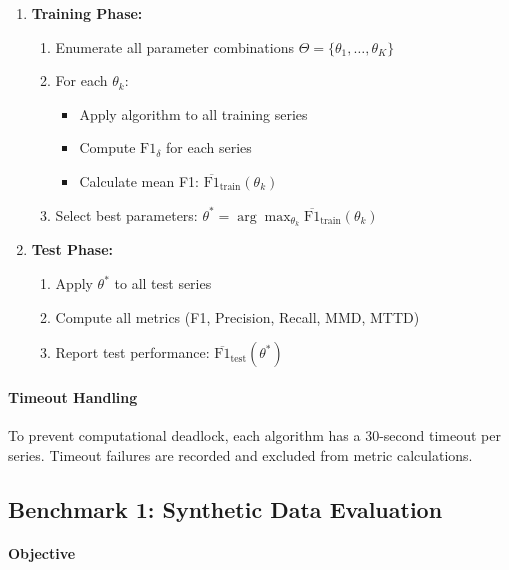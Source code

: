 \documentclass[journal,article,submit,pdftex,moreauthors]{Definitions/mdpi}
\begin{document}
\begin{enumerate}
    \item \textbf{Training Phase:}
    \begin{enumerate}
        \item Enumerate all parameter combinations $\Theta = \{\theta_1, \ldots, \theta_K\}$
        \item For each $\theta_k$:
        \begin{itemize}
            \item Apply algorithm to all training series
            \item Compute $\text{F1}_{\delta}$ for each series
            \item Calculate mean F1: $\overline{\text{F1}}_{\text{train}}(\theta_k)$
        \end{itemize}
        \item Select best parameters: $\theta^* = \arg\max_{\theta_k} \overline{\text{F1}}_{\text{train}}(\theta_k)$
    \end{enumerate}
    
    \item \textbf{Test Phase:}
    \begin{enumerate}
        \item Apply $\theta^*$ to all test series
        \item Compute all metrics (F1, Precision, Recall, MMD, MTTD)
        \item Report test performance: $\overline{\text{F1}}_{\text{test}}(\theta^*)$
    \end{enumerate}
\end{enumerate}

\paragraph{Timeout Handling}

To prevent computational deadlock, each algorithm has a 30-second timeout per series. Timeout failures are recorded and excluded from metric calculations.

\subsection{Benchmark 1: Synthetic Data Evaluation}
\label{sec:benchmark1}

\paragraph{Objective}
\end{document}
